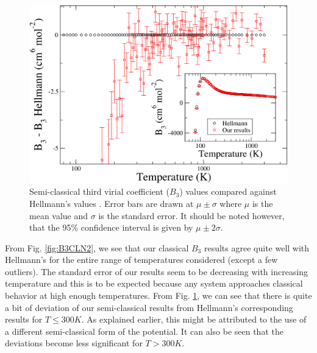         \begin{figure}[!htbp]
            \centering
            \includegraphics[scale=0.20,keepaspectratio]{Chapter-5/Figures/B3SCFull8sResultsAll.png}
            \caption{Semi-classical third virial coefficient ($B_3$) values compared against Hellmann's values \cite{Hellmann2013}. Error bars are drawn at $\mu \pm \sigma$ where $\mu$ is the mean value and $\sigma$ is the standard error. It should be noted however, that the 95\% confidence interval is given by $\mu \pm 2\sigma$.}
            \label{fig:B3SCN2}
        \end{figure}

        From Fig. \ref{fig:B3CLN2}, we see that our classical $B_3$ results agree quite well with Hellmann's for the entire range of temperatures considered (except a few outliers). The standard error of our results seem to be decreasing with increasing temperature and this is to be expected because any system approaches classical behavior at high enough temperatures. From Fig. \ref{fig:B3SCN2}, we can see that there is quite a bit of deviation of our semi-classical results from Hellmann's corresponding results for $T \le 300K$. As explained earlier, this might be attributed to the use of a different semi-classical form of the \abinitio{} potential. It can also be seen that the deviations become less significant for $T > 300K$. 
        
